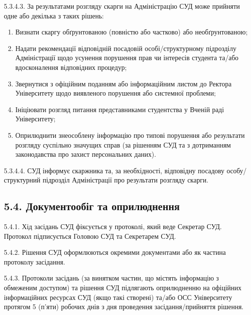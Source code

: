         5.3.4.3. За результатами розгляду скарги на Адміністрацію СУД може прийняти одне або декілька з таких рішень:

            \begin{enumerate}[label=\alph*)]
                \item Визнати скаргу обґрунтованою (повністю або частково) або необґрунтованою;
                \item Надати рекомендації відповідній посадовій особі/структурному підрозділу Адміністрації щодо усунення порушення прав чи інтересів студента та/або вдосконалення відповідних процедур;
                \item Звернутися з офіційним поданням або інформаційним листом до Ректора Університету щодо виявленого порушення або системної проблеми;
                \item Ініціювати розгляд питання представниками студентства у Вченій раді Університету;
                \item Оприлюднити знеособлену інформацію про типові порушення або результати розгляду суспільно значущих справ (за рішенням СУД та з дотриманням законодавства про захист персональних даних).
            \end{enumerate}

        5.3.4.4. СУД інформує скаржника та, за необхідності, відповідну посадову особу/структурний підрозділ Адміністрації про результати розгляду скарги.

\subsection*{5.4. Документообіг та оприлюднення}
    5.4.1. Хід засідань СУД фіксується у протоколі, який веде Секретар СУД. Протокол підписується Головою СУД та Секретарем СУД.

    5.4.2. Рішення СУД оформлюються окремими документами або як частина протоколу засідання.

    5.4.3. Протоколи засідань (за винятком частин, що містять інформацію з обмеженим доступом) та рішення СУД підлягають оприлюдненню на офіційних інформаційних ресурсах СУД (якщо такі створені) та/або ОСС Університету протягом 5 (п'яти) робочих днів з дня проведення засідання/прийняття рішення. 